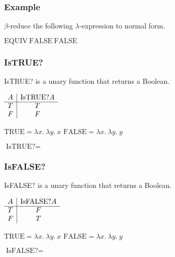 \documentclass{beamer}
\begin{document}
\begin{frame}
	\frametitle{Example}

	$\beta$-reduce the following $\lambda$-expression to normal form.

	\vspace{0.5cm}

	$\text{EQUIV} \ \text{FALSE} \ \text{FALSE}$

	\vspace{6cm}


\end{frame}

\begin{frame}
	\frametitle{IsTRUE?}

	IsTRUE? is a unary function that returns a Boolean.

	\begin{center}
		$\begin{array}{ l | c }			
			A &  \text{IsTRUE?} A\\
			\cline{1 - 2}
			T &  T \\ 
			F &  F
		\end{array}$
	\end{center}

	$\text{TRUE} = \lambda x. \ \lambda y. \ x$ \hspace{4cm} $\text{FALSE} = \lambda x. \ \lambda y. \ y$

	\vspace{0.5cm}

	$\text{IsTRUE?} = $

	\vspace{3cm}

\end{frame}

\begin{frame}
	\frametitle{IsFALSE?}

	IsFALSE? is a unary function that returns a Boolean.

	\begin{center}
		$\begin{array}{ l | c }			
			A &  \text{IsFALSE?} A\\
			\cline{1 - 2}
			T &  F \\ 
			F &  T
		\end{array}$
	\end{center}

	$\text{TRUE} = \lambda x. \ \lambda y. \ x$ \hspace{4cm} $\text{FALSE} = \lambda x. \ \lambda y. \ y$

	\vspace{0.5cm}

	$\text{IsFALSE?} = $

	\vspace{3cm}

\end{frame}
\end{document}
